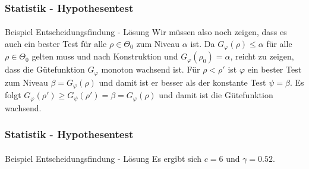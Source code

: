 \documentclass{beamer}
\begin{document}
\begin{frame}
    \frametitle{Statistik - Hypothesentest}
\framesubtitle{}

\begin{block}{Beispiel Entscheidungsfindung - Lösung}
Wir müssen also noch zeigen, dass es auch ein bester Test für alle $\rho \in \Theta_0$ zum Niveau $\alpha$ ist. 
Da  $G_{\varphi} (\rho) \leq \alpha$ für alle $\rho \in \Theta_0$  gelten muss und nach Konstruktion und $G_{\varphi} (\rho_0) = \alpha$, reicht zu zeigen, dass die Gütefunktion  $G_{\varphi}$ monoton wachsend ist. Für $\rho < \rho'$ ist $\varphi$ ein bester Test zum Niveau $\beta = G_{\varphi} (\rho)$ und damit ist er besser als der konstante Test  $\psi = \beta$. Es folgt  
$G_{\varphi} (\rho') \geq G_{\psi} (\rho') = \beta = G_{\varphi} (\rho) $ und damit ist die Gütefunktion  wachsend.
\end{block}

 \end{frame}



\begin{frame}
    \frametitle{Statistik - Hypothesentest}
\framesubtitle{}

\begin{block}{Beispiel Entscheidungsfindung - Lösung}
Es ergibt sich $c = 6$ und $\gamma = 0.52$.
\end{block}

 \end{frame}
\end{document}
